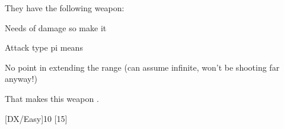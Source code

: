 They have the following weapon:
\begin{innateattack}
  \item Needs  of damage so make it 
  \item Attack type pi means 
  \item No point in extending the range (can assume infinite, won't be shooting
    far anyway!)
  \item That makes this weapon \InnateAttackTotalPoints.
\end{innateattack}

\begin{character}
  [DX/Easy]{10}
  [15]
\end{character}

